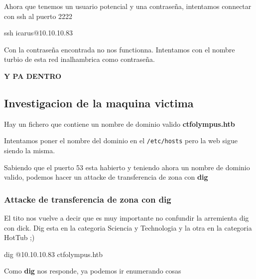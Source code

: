 \documentclass{assets/ipesethesis}
\newenvironment{Shaded}{\begin{snugshade}}{\end{snugshade}}
\newcommand{\ExtensionTok}[1]{#1}
\newcommand{\FunctionTok}[1]{\textcolor[rgb]{0.00,0.00,0.00}{#1}}
\newcommand{\NormalTok}[1]{#1}
\begin{document}
Ahora que tenemos un usuario potencial y una contraseña, intentamos connectar con ssh al puerto 2222

\begin{Shaded}
\begin{Highlighting}[]
\FunctionTok{ssh}\NormalTok{ icarus@10.10.10.83}
\end{Highlighting}
\end{Shaded}

Con la contraseña encontrada no nos functionna.
Intentamos con el nombre turbio de esta red inalhambrica como contraseña.

\textbf{Y PA DENTRO}

\hypertarget{investigacion-de-la-maquina-victima}{%
\subsection*{Investigacion de la maquina victima}\label{investigacion-de-la-maquina-victima}}

Hay un fichero que contiene un nombre de dominio valido \textbf{ctfolympus.htb}

Intentamos poner el nombre del dominio en el \texttt{/etc/hosts} pero la web sigue siendo la misma.

Sabiendo que el puerto 53 esta habierto y teniendo ahora un nombre de dominio valido, podemos
hacer un attacke de transferencia de zona con \textbf{dig}

\hypertarget{attacke-de-transferencia-de-zona-con-dig}{%
\subsubsection*{Attacke de transferencia de zona con dig}\label{attacke-de-transferencia-de-zona-con-dig}}

El tito nos vuelve a decir que es muy importante no confundir la arremienta dig con dick. Dig esta en
la categoria Sciencia y Technologia y la otra en la categoria HotTub ;)

\begin{Shaded}
\begin{Highlighting}[]
\ExtensionTok{dig}\NormalTok{ @10.10.10.83 ctfolympus.htb}
\end{Highlighting}
\end{Shaded}

Como \textbf{dig} nos responde, ya podemos ir enumerando cosas
\end{document}
